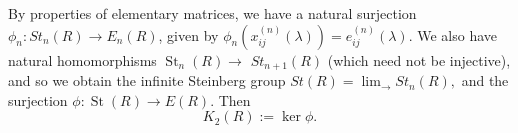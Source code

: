 By properties of elementary matrices, we have a natural surjection $\phi_n: S t_n(R) \rightarrow E_n(R)$, given by $\phi_n\left(x_{i j}^{(n)}(\lambda)\right)=e_{i j}^{(n)}(\lambda)$. We also have natural homomorphisms $\operatorname{St}_n(R) \rightarrow$ $S t_{n+1}(R)$ (which need not be injective), and so we obtain the infinite Steinberg group
$
S t(R)=\lim _{\rightarrow} S t_n(R),
$
and the surjection $\phi: \operatorname{St}(R) \longrightarrow E(R)$. Then $$K_2(R):=\ker \phi.$$













